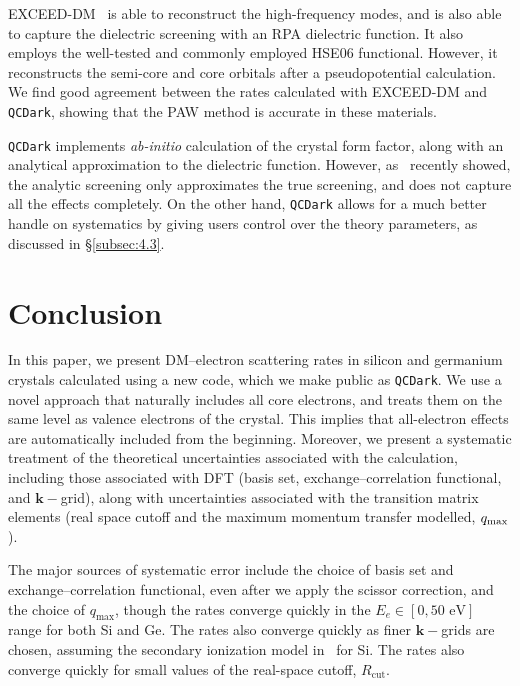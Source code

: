 \documentclass[
    prd, twocolumn, superscriptaddress, nofootinbib, amsmath, amssymb,
    aps, floatfix,preprintnumbers
]{revtex4-2}
\begin{document}
    EXCEED-DM~\cite{Trickle2022} is able to reconstruct the high-frequency modes, and is also able to capture the dielectric screening with an RPA dielectric function. It also employs the well-tested and commonly employed HSE06 functional. However, it reconstructs the semi-core and core orbitals after a pseudopotential calculation. We find good agreement between the rates calculated with EXCEED-DM and \texttt{QCDark}, showing that the PAW method is accurate in these materials.
    
    \texttt{QCDark} implements \textit{ab-initio} calculation of the crystal form factor, along with an analytical approximation to the dielectric function. However, as~\cite{Trickle2022} recently showed, the analytic screening only approximates the true screening, and does not capture all the effects completely. On the other hand, \texttt{QCDark} allows for a much better handle on systematics by giving users control over the theory parameters, as discussed in \S\ref{subsec:4.3}. 

\section{Conclusion}\label{sec:6}
    In this paper, we present DM--electron scattering rates in silicon and germanium crystals calculated using a new code, which we make public as \texttt{QCDark}. We use a novel approach that naturally includes all core electrons, and treats them on the same level as valence electrons of the crystal. This implies that all-electron effects are automatically included from the beginning. Moreover, we present a systematic treatment of the theoretical uncertainties associated with the calculation, including those associated with DFT (basis set, exchange--correlation functional, and $\mathbf{k}-$grid), along with uncertainties associated with the transition matrix elements (real space cutoff and the maximum momentum transfer modelled, $q_{\rm max}$). 
    
    The major sources of systematic error include the choice of basis set and exchange--correlation functional, even after we apply the scissor correction, and the choice of $q_\mathrm{max}$, though the rates converge quickly in the $E_e\in[0, 50\text{ eV}]$ range for both Si and Ge. The rates also converge quickly as finer $\mathbf{k}-$grids are chosen, assuming the secondary ionization model in~\cite{Ramanathan2020} for Si. The rates also converge quickly for small values of the real-space cutoff, $R_\mathrm{cut}$.
    
\end{document}
